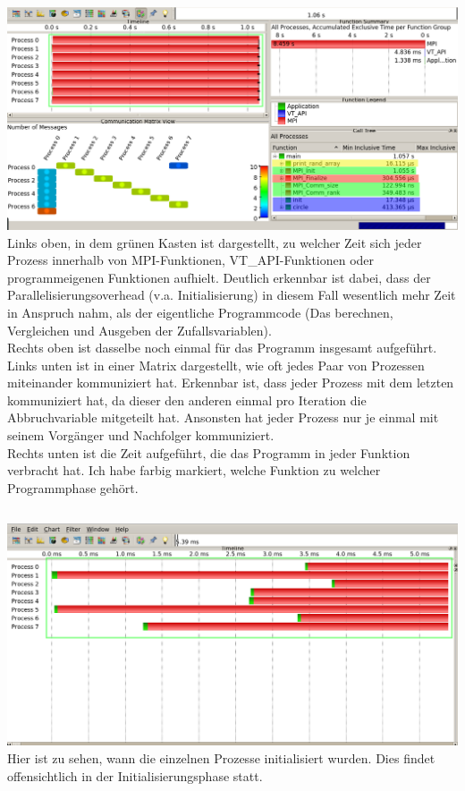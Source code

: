 \documentclass[fleqn]{article}
\begin{document}
\subsection{}%
\includegraphics[width=\textwidth]{vampir1}
Links oben, in dem grünen Kasten ist dargestellt, zu welcher Zeit sich jeder Prozess innerhalb von MPI-Funktionen, VT\_API-Funktionen oder programmeigenen Funktionen aufhielt. Deutlich erkennbar ist dabei, dass der Parallelisierungsoverhead (v.a. Initialisierung) in diesem Fall wesentlich mehr Zeit in Anspruch nahm, als der eigentliche Programmcode (Das berechnen, Vergleichen und Ausgeben der Zufallsvariablen).\\
Rechts oben ist dasselbe noch einmal für das Programm insgesamt aufgeführt.\\
Links unten ist in einer Matrix dargestellt, wie oft jedes Paar von Prozessen miteinander kommuniziert hat. Erkennbar ist, dass jeder Prozess mit dem letzten kommuniziert hat, da dieser den anderen einmal pro Iteration die Abbruchvariable mitgeteilt hat. Ansonsten hat jeder Prozess nur je einmal mit seinem Vorgänger und Nachfolger kommuniziert.\\
Rechts unten ist die Zeit aufgeführt, die das Programm in jeder Funktion verbracht hat. Ich habe farbig markiert, welche Funktion zu welcher Programmphase gehört.

\subsection{}%
\includegraphics[width=\textwidth]{vampir2}
Hier ist zu sehen, wann die einzelnen Prozesse initialisiert wurden. Dies findet offensichtlich in der Initialisierungsphase statt.
\end{document}

